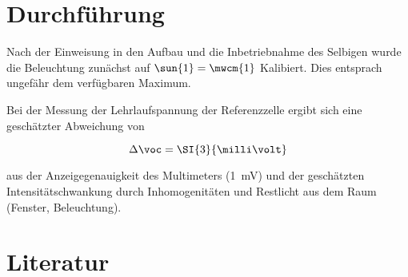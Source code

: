\documentclass[slug=SZ, room=Hermann-Krone-Bau\,\ Labor\ 1.25, supervisor=Martin\ Kroll]{../../Lab_Report_LaTeX/lab_report}
\begin{document}
\section{Durchf\"uhrung}
\label{sec:durchf}

Nach der Einweisung in den Aufbau und die Inbetriebnahme des Selbigen
wurde die Beleuchtung zun\"achst auf $\sun{1}=\mwcm{1}$
Kalibiert. Dies entsprach ungef\"ahr dem verf\"ugbaren Maximum.

Bei der Messung der Lehrlaufspannung der Referenzzelle ergibt sich eine
gesch\"atzter Abweichung von

\begin{equation}
  \label{eq:deltavocref}
  \Delta \voc = \SI{3}{\milli\volt}
\end{equation}

aus der Anzeigegenauigkeit des Multimeters (\SI{1}{\milli\volt}) und
der gesch\"atzten Intensit\"atschwankung durch Inhomogenit\"aten und
Restlicht aus dem Raum (Fenster, Beleuchtung).

\section{Literatur}
\label{sec:literatur}

\printbibliography
\end{document}

